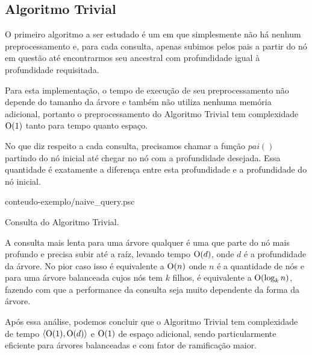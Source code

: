 \subsection{Algoritmo Trivial}

O primeiro algoritmo a ser estudado é um em que simplesmente não há
nenhum preprocessamento e, para cada consulta, apenas subimos pelos pais a
partir do nó em questão até encontrarmos seu ancestral com profundidade igual
à profundidade requisitada.

Para esta implementação, o tempo de execução de seu preprocessamento não depende do
tamanho da árvore e também não utiliza nenhuma memória adicional, portanto o
preprocessamento do Algoritmo Trivial tem complexidade $\mathrm{O}(1)$ tanto para tempo
quanto espaço.


No que diz respeito a cada consulta, precisamos chamar a função $pai()$
partindo do nó inicial até chegar no nó com a profundidade desejada.
Essa quantidade é exatamente a diferença entre esta profundidade e a
profundidade do nó inicial.

\begin{program}[]
  
  {conteudo-exemplo/naive_query.psc}

  \caption{Consulta do Algoritmo Trivial.\label{prog:naivequery}}
\end{program}

A consulta mais lenta para uma árvore qualquer é uma que parte do nó mais profundo
e precisa subir até a raíz, levando tempo $\mathrm{O}(d)$, onde $d$ é a profundidade
da árvore. No pior caso isso é equivalente a $\mathrm{O}(n)$ onde $n$ é a quantidade
de nós e para uma árvore balanceada cujos nós tem $k$ filhos, é equivalente a
$\mathrm{O}(\log_k n)$, fazendo com que a performance da consulta seja muito dependente da
forma da árvore.

Após essa análise, podemos concluir que o Algoritmo Trivial tem complexidade de tempo
$\langle \mathrm{O}(1), \mathrm{O}(d) \rangle$ e $\mathrm{O}(1)$ de espaço adicional, sendo
particularmente eficiente para árvores balanceadas e com fator de ramificação maior.


